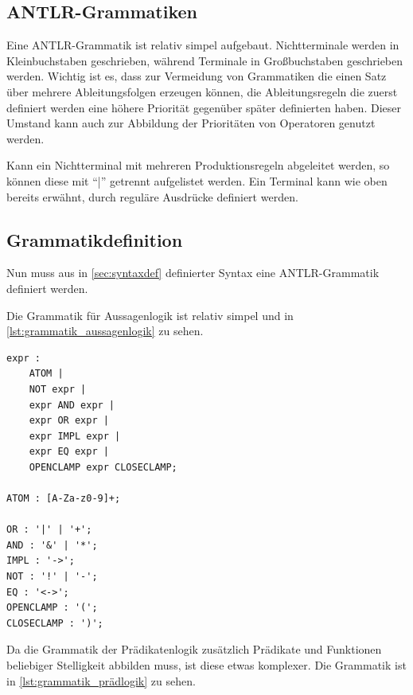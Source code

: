 \subsection{ANTLR-Grammatiken}
Eine ANTLR-Grammatik ist relativ simpel aufgebaut. Nichtterminale werden in Kleinbuchstaben geschrieben, während Terminale in Großbuchstaben geschrieben werden. Wichtig ist es, dass zur Vermeidung von Grammatiken die einen Satz über mehrere Ableitungsfolgen erzeugen können, die Ableitungsregeln die zuerst definiert werden eine höhere Priorität gegenüber später definierten haben. \cite{antlr_doc}
Dieser Umstand kann auch zur Abbildung der Prioritäten von Operatoren genutzt werden.

Kann ein Nichtterminal mit mehreren Produktionsregeln abgeleitet werden, so können diese mit ``|'' getrennt aufgelistet werden. Ein Terminal kann wie oben bereits erwähnt, durch reguläre Ausdrücke definiert werden.

\subsection{Grammatikdefinition}
Nun muss aus in \autoref{sec:syntaxdef} definierter Syntax eine ANTLR-Grammatik definiert werden.

Die Grammatik für Aussagenlogik ist relativ simpel und in \autoref{lst:grammatik_aussagenlogik} zu sehen.

\begin{lstlisting}[caption={Grammatik der Aussagenlogik},label=lst:grammatik_aussagenlogik]
expr :
	ATOM |
	NOT expr |
	expr AND expr |
	expr OR expr |
	expr IMPL expr |
	expr EQ expr |
	OPENCLAMP expr CLOSECLAMP;

ATOM : [A-Za-z0-9]+;

OR : '|' | '+';
AND : '&' | '*';
IMPL : '->';
NOT : '!' | '-';
EQ : '<->';
OPENCLAMP : '(';
CLOSECLAMP : ')';
\end{lstlisting}

Da die Grammatik der Prädikatenlogik zusätzlich Prädikate und Funktionen beliebiger Stelligkeit abbilden muss, ist diese etwas komplexer. Die Grammatik ist in \autoref{lst:grammatik_prädlogik} zu sehen.

